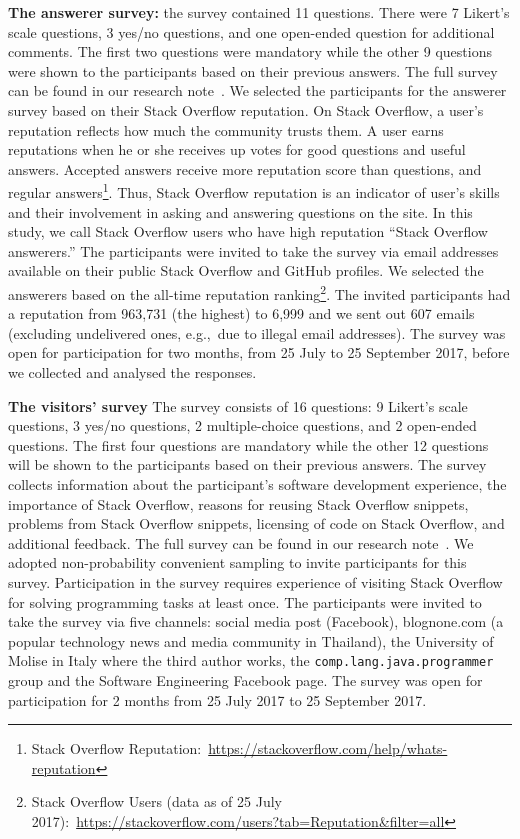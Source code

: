 \documentclass[10pt,journal,compsoc]{IEEEtran}
\begin{document}
\textbf{The answerer survey:} the survey contained
11 questions. There were 7 Likert's scale questions, 3 yes/no questions, and one
open-ended question for additional comments. The first two questions were
mandatory while the other 9 questions were shown to the participants based on
their previous answers. The full survey can be found in our research note~\cite{Ragkhitwetsagul_RN2017}.
We selected the participants for the answerer survey based on their Stack Overflow
reputation. On Stack Overflow, a user's reputation reflects how much the
community trusts them. A user earns reputations when he or she receives up votes
for good questions and useful answers. Accepted answers receive more reputation
score than questions, and regular answers\footnote{Stack Overflow
	Reputation:~\url{https://stackoverflow.com/help/whats-reputation}}. Thus, Stack
Overflow reputation is an indicator of user's skills and their involvement in
asking and answering questions on the site. In this study, we call Stack
Overflow users who have high reputation ``Stack Overflow answerers.''
The participants were invited to take the survey via email addresses available
on their public Stack Overflow and GitHub profiles. We selected the answerers
based on the all-time reputation ranking\footnote{Stack Overflow Users (data as
	of 25 July 2017):~\url{https://stackoverflow.com/users?tab=Reputation&filter=all}}. The
invited participants had a reputation from 963,731 (the highest) to 6,999 and
we sent out 607 emails (excluding undelivered ones, e.g.,\ due to
illegal email addresses). 
The survey was
open for participation for two months, from 25 July to 25 September 2017, before
we collected and analysed the responses.

\textbf{The visitors' survey}
The survey consists of 16 questions: 9 Likert's
scale questions, 3 yes/no questions, 2 multiple-choice questions, and 2
open-ended questions. 
The first four questions are mandatory while the other 12
questions will be shown to the participants based on their previous answers. 
The survey collects information about the participant's software development
experience, the importance of Stack Overflow, reasons for reusing Stack Overflow
snippets, problems from Stack Overflow snippets, licensing of code on Stack
Overflow, and additional feedback. 
The full survey can be found in our research note~\cite{Ragkhitwetsagul_RN2017}.
We adopted non-probability convenient sampling to invite participants for this
survey. Participation in the survey requires experience of visiting Stack
Overflow for solving programming tasks at least once. The participants were
invited to take the survey via five channels: social media post (Facebook),
\textsf{blognone.com} (a popular technology news and media community in Thailand), 
the University of Molise in Italy where the third author
works, the \texttt{comp.lang.java.programmer} group and the Software Engineering
Facebook page. 
The survey was open for participation for 2 months 
from 25 July 2017 to 25 September 2017.
\end{document}

